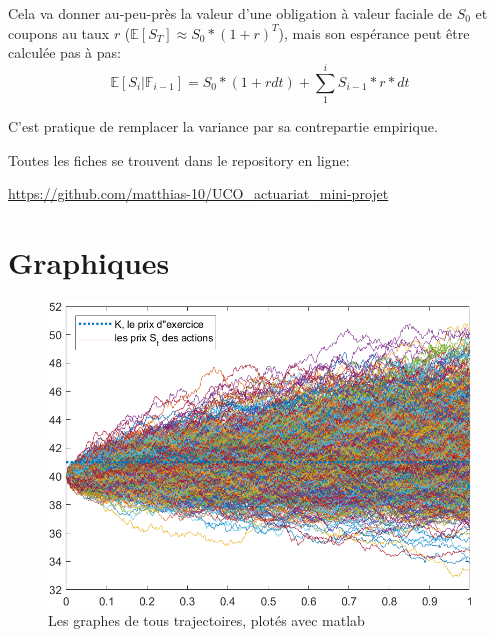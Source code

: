 \documentclass[a4paper,12pt]{scrartcl}
\begin{document}
Cela va donner au-peu-près la valeur d'une obligation à valeur faciale de $S_0$ et coupons au taux $r$ 
($\mathbb{E}[S_{T}] \approx S_0*(1+r)^T$), 
mais son espérance peut être calculée pas à pas:
$$\mathbb{E}[S_i | \mathbb{F}_{i-1}] = S_0*(1+rdt) + \sum_1^i S_{i-1}*r*dt $$

C'est pratique de remplacer la variance par sa contrepartie empirique. 

\clearpage

\appendix
\appendixpage
\addappheadtotoc

\begin{center}
Toutes les fiches se trouvent dans le repository en ligne: 

 \url{https://github.com/matthias-10/UCO_actuariat_mini-projet}
\end{center}

\section{Graphiques} \label{graphiques}

\begin{figure}[h!]
  \begin{center}
    \includegraphics[width=14cm]{"graphiques/S.png"}
    \caption{Les graphes de tous trajectoires, plotés avec matlab}
    \label{fig:S}
  \end{center}
\end{figure}
\end{document}
